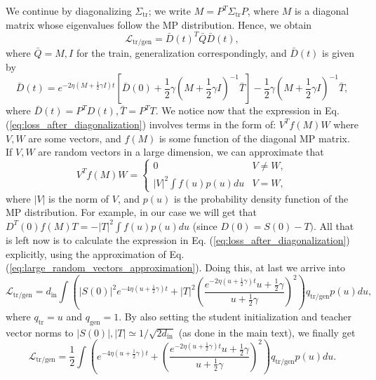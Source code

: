 \documentclass[a4paper,11pt]{article}
\newcommand{\din}{d_\mathrm{in}}
\newcommand{\training}{\mathrm{tr}}
\newcommand{\gen}{\mathrm{gen}}
\newcommand{\mcL}{\mathcal{L}}
\begin{document}
We continue by diagonalizing $\Sigma_{\training}$;
we write $M=P^{T}\Sigma_{ \training }P$, where $M$ is a diagonal
matrix whose eigenvalues follow the MP distribution. Hence, we obtain
\begin{equation}
    \mcL_{\training/\gen}=\bar{D}(t)^{T}\bar{Q}\bar{D}(t),
    \label{eq:loss_after_diagonalization}
\end{equation}
where $\bar{Q}=M,I$ for the train, generalization correspondingly, and $\bar{D}(t)$
is given by
\begin{equation}
    \bar{D}(t)=e^{-2\eta\left(M+\frac{1}{2}\gamma I\right)t}\left[\bar{D}(0)+\frac{1}{2}\gamma\left(M+\frac{1}{2}\gamma I\right)^{-1}\bar{T}\right]-\frac{1}{2}\gamma\left(M+\frac{1}{2}\gamma I\right)^{-1}\bar{T},
\end{equation}
where $\bar{D}(t)=P^{T}D(t),\bar{T}=P^{T}T$. We notice now that the
expression in Eq. (\ref{eq:loss_after_diagonalization}) involves terms in the form of: $V^{T}f(M)W$
where $V,W$ are some vectors, and $f(M)$ is some function of the
diagonal MP matrix. If $V,W$ are random vectors in a large dimension,
we can approximate that
\begin{equation}
    V^{T}f(M)W=\begin{cases}
        0 & V\neq W,\\
        |V|^{2}\int f(u)p(u)du & V=W,
    \end{cases}\label{eq:large_random_vectors_approximation}
\end{equation}
where $|V|$ is the norm of $V$, and $p(u)$ is the probability density
function of the MP distribution. For example, in our case we will
get that $D^{T}(0)f(M)T=-|T|^{2}\int f(u)p(u)du$ (since $D(0)=S(0)-T)$.
All that is left now is to calculate the expression in Eq. (\ref{eq:loss_after_diagonalization})
explicitly, using the approximation of Eq. (\ref{eq:large_random_vectors_approximation}).
Doing this, at last we arrive into
\begin{equation}
    \mcL_{\training/\gen}=
    \din\int\left(|S(0)|^{2}e^{-4\eta\left(u+\frac{1}{2}\gamma\right)t}+|T|^{2}\left(\frac{e^{-2\eta\left(u+\frac{1}{2}\gamma\right)t}u+\frac{1}{2}\gamma}{u+\frac{1}{2}\gamma}\right)^{2}\right)q_\mathrm{\training/gen}p(u)du,
\end{equation}
where $q_\training=u$ and $q_\gen=1$. By also setting the student initialization and teacher vector norms to $|S(0)|, |T| \simeq 1/\sqrt{2\din}$ (as done in the main text), we finally get
\begin{equation}
    \mcL_{\mathrm{\training/gen}}=
    \frac{1}{2}
    \int\left(e^{-4\eta\left(u+\frac{1}{2}\gamma\right)t}
    +\left(\frac{e^{-2\eta\left(u+\frac{1}{2}\gamma\right)t}u+\frac{1}{2}\gamma}{u+\frac{1}{2}\gamma}\right)^{2}\right)q_\mathrm{\training/gen}p(u)du.
\end{equation}
\end{document}
